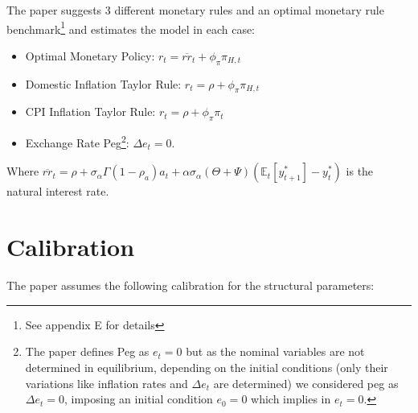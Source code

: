 \documentclass{article}
\newcommand{\Et}{\mathbb{E}_t}
\begin{document}
\vspace{6pt}

The paper suggests 3 different monetary rules and an optimal monetary rule benchmark\footnote{See appendix E for details} and estimates the model in each case:

\begin{itemize}
    \item Optimal Monetary Policy: $r_t = \overline{rr}_t + \phi_\pi \pi_{H, t}$
    \item Domestic Inflation Taylor Rule: $r_t = \rho + \phi_\pi \pi_{H, t}$
    \item CPI Inflation Taylor Rule: $r_t = \rho + \phi_\pi \pi_{t}$
    \item Exchange Rate Peg\footnote{The paper defines Peg as $e_t = 0$ but as the nominal variables are not determined in equilibrium, depending on the initial conditions (only their variations like inflation rates and $\Delta e_t$ are determined) we considered peg as $\Delta e_t = 0$, imposing an initial condition $e_0 = 0$ which implies in $e_t = 0$.}: $\Delta e_t = 0$.
\end{itemize}

Where $\overline{rr}_t = \rho + \sigma_\alpha \Gamma (1 - \rho_a) a_t + \alpha \sigma_\alpha (\Theta + \Psi)(\Et[y_{t+1}^*] - y_t^*)$ is the natural interest rate.

\section{Calibration}
The paper assumes the following calibration for the structural parameters:
\end{document}
